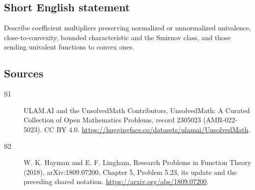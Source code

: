 \documentclass[11pt]{article}
\begin{document}
\subsection{Short English statement}
Describe coefficient multipliers preserving normalized or unnormalized univalence, close-to-convexity, bounded characteristic and the Smirnov class, and those sending univalent functions to convex ones.
\subsection{Sources}
\begin{description}
\item[\hypertarget{source:2305023:1}{S1}] ULAM.AI and the UnsolvedMath Contributors, UnsolvedMath: A Curated Collection of Open Mathematics Problems, record 2305023 (AMR-022-5023). CC BY 4.0. \url{https://huggingface.co/datasets/ulamai/UnsolvedMath}.
\item[\hypertarget{source:2305023:2}{S2}] W. K. Hayman and E. F. Lingham, Research Problems in Function Theory (2018), arXiv:1809.07200, Chapter 5, Problem 5.23, its update and the preceding shared notation. \url{https://arxiv.org/abs/1809.07200}.
\end{description}
\label{end:2305023}
\end{document}

